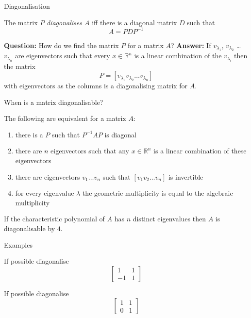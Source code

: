 \documentclass{beamer}
\begin{document}
\begin{frame}{Diagonalisation}
\begin{definition}
The matrix $P$ \emph{diagonalises $A$} iff there is a diagonal matrix $D$ such that
\begin{equation*}
A = PDP^{-1}
\end{equation*}
\end{definition}\vfill
{\bf Question:} How do we find the matrix $P$ for a matrix $A$?\vfill
{\bf Answer:} If $v_{\lambda_1}$, $v_{\lambda_2}$ \dots $v_{\lambda_n}$ are eigenvectors such that every $x\in \mathbb{R}^n$ is a linear combination of the $v_{\lambda_i}$ then the matrix
\begin{equation*}
P = \left[ v_{\lambda_1} v_{\lambda_2} \dots v_{\lambda_n}\right]
\end{equation*}
with eigenvectors as the columns is a diagonalising matrix for $A$.
\end{frame}

\begin{frame}{When is a matrix diagonalisable?}
\begin{theorem}
The following are equivalent for a matrix $A$:
\begin{enumerate}
	\item there is a $P$ such that $P^{-1}AP$ is diagonal
	\item there are $n$ eigenvectors such that any $x\in \mathbb{R}^n$ is a linear combination of these eigenvectors
	\item there are eigenvectors $v_1\dots v_n$ such that $\left[v_1 v_2\dots v_n \right]$ is invertible
	\item for every eigenvalue $\lambda$ the geometric multiplicity is equal to the algebraic multiplicity
\end{enumerate}
\end{theorem}

\begin{lemma}
If the characteristic polynomial of $A$ has $n$ distinct eigenvalues then $A$ is diagonalisable by $4$.
\end{lemma}
\end{frame}

\begin{frame}{Examples}
\begin{example}
If possible diagonalise
\begin{equation*}
\left[
\begin{matrix}
1&1\\
-1&1
\end{matrix}
\right]
\end{equation*}
\end{example}
\begin{example}
If possible diagonalise
\begin{equation*}
\left[
\begin{matrix}
1&1\\
0&1
\end{matrix}
\right]
\end{equation*}
\end{example}
\end{frame}
\end{document}
